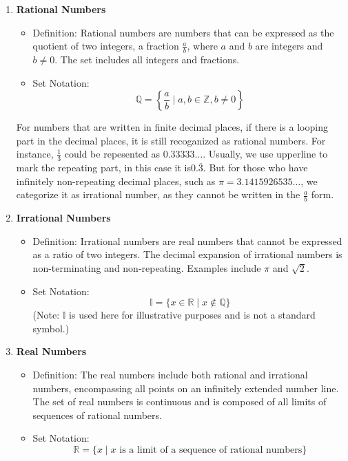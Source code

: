 \begin{enumerate}
  \item \textbf{Rational Numbers}
  \begin{itemize}
    \item Definition: Rational numbers are numbers that can be expressed as the quotient of two integers, a fraction \( \frac{a}{b} \), where \( a \) and \( b \) are integers and \( b \neq 0 \). The set includes all integers and fractions.
    \item Set Notation:
    \[
    \mathbb{Q} = \left\{\frac{a}{b} \mid a, b \in \mathbb{Z}, b \neq 0\right\}
    \]
  \end{itemize}
\begin{remark}
    For numbers that are written in finite decimal places, if there is a looping part in the decimal places,
    it is still recoganized as rational numbers. For instance, $\frac{1}{3}$ could be repesented as $0.33333\dots$.
    Usually, we use upperline to mark the repeating part, in this case it is$0.\overline{3}$. But for those who
    have infinitely non-repeating decimal places, such as $\pi=3.1415926535\dots$, we categorize it as irrational number,
    as they cannot be written in the $\frac{a}{b}$ form.
\end{remark}
  \item \textbf{Irrational Numbers}
  \begin{itemize}
    \item Definition: Irrational numbers are real numbers that cannot be expressed as a ratio of two integers. The decimal expansion of irrational numbers is non-terminating and non-repeating. Examples include \(\pi\) and \(\sqrt{2}\).
    \item Set Notation:
    \[
    \mathbb{I} = \{x \in \mathbb{R} \mid x \notin \mathbb{Q}\}
    \]
    (Note: \(\mathbb{I}\) is used here for illustrative purposes and is not a standard symbol.)
  \end{itemize}

  \item \textbf{Real Numbers}
  \begin{itemize}
    \item Definition: The real numbers include both rational and irrational numbers, encompassing all points on an infinitely extended number line. The set of real numbers is continuous and is composed of all limits of sequences of rational numbers.
    \item Set Notation:
    \[
    \mathbb{R} = \{x \mid x \text{ is a limit of a sequence of rational numbers}\}
    \]
  \end{itemize}


\end{enumerate}
